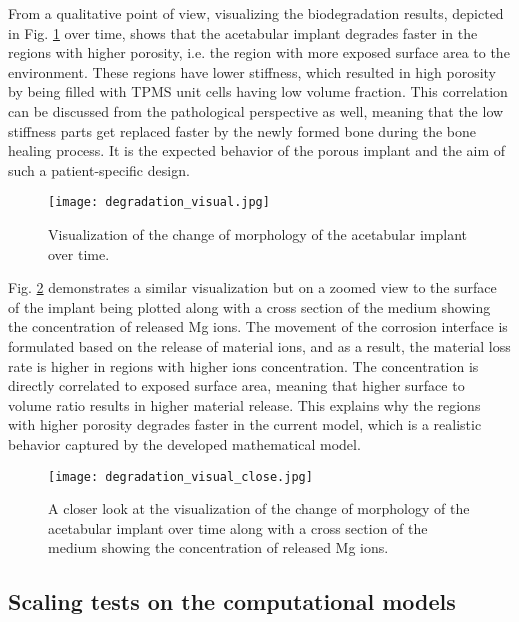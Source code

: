 From a qualitative point of view, visualizing the biodegradation results, depicted in Fig. \ref{fig:cup_degradation_visual} over time, shows that the acetabular implant degrades faster in the regions with higher porosity, i.e. the region with more exposed surface area to the environment. These regions have lower stiffness, which resulted in high porosity by being filled with TPMS unit cells having low volume fraction. This correlation can be discussed from the pathological perspective as well, meaning that the low stiffness parts get replaced faster by the newly formed bone during the bone healing process. It is the expected behavior of the porous implant and the aim of such a patient-specific design.

\begin{figure}[h]
\centering
\medskip
\texttt{[image: degradation\_visual.jpg]}
\caption[Visualization of the change of morphology of the acetabular implant]{Visualization of the change of morphology of the acetabular implant over time.} \label{fig:cup_degradation_visual}
\end{figure}

Fig. \ref{fig:cup_degradation_visual_close} demonstrates a similar visualization but on a zoomed view to the surface of the implant being plotted along with a cross section of the medium showing the concentration of released Mg ions. The movement of the corrosion interface is formulated based on the release of material ions, and as a result, the material loss rate is higher in regions with higher ions concentration. The  concentration is directly correlated to exposed surface area, meaning that higher surface to volume ratio results in higher material release. This explains why the regions with higher porosity degrades faster in the current model, which is a realistic behavior captured by the developed mathematical model. 

\begin{figure}[h]
\centering
\medskip
\texttt{[image: degradation\_visual\_close.jpg]}
\caption[Visualization of the change of morphology of the acetabular implant]{A closer look at the visualization of the change of morphology of the acetabular implant over time along with a cross section of the medium showing the concentration of released Mg ions.} \label{fig:cup_degradation_visual_close}
\end{figure}

\subsection{Scaling tests on the computational models}

